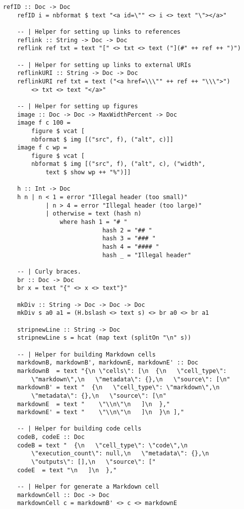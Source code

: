 \begin{lstlisting}[language=haskell1, 
	basicstyle=\linespread{1.1}\small\ttfamily]
	refID :: Doc -> Doc 
	refID i = nbformat $ text "<a id=\"" <> i <> text "\"></a>"
	
	-- | Helper for setting up links to references
	reflink :: String -> Doc -> Doc
	reflink ref txt = text "[" <> txt <> text ("](#" ++ ref ++ ")")
	
	-- | Helper for setting up links to external URIs
	reflinkURI :: String -> Doc -> Doc
	reflinkURI ref txt = text ("<a href=\\\"" ++ ref ++ "\\\">") 
		<> txt <> text "</a>"
	
	-- | Helper for setting up figures
	image :: Doc -> Doc -> MaxWidthPercent -> Doc
	image f c 100 = 
		figure $ vcat [
		nbformat $ img [("src", f), ("alt", c)]]
	image f c wp =
		figure $ vcat [
		nbformat $ img [("src", f), ("alt", c), ("width", 
			text $ show wp ++ "%")]]
	
	h :: Int -> Doc
	h n | n < 1 = error "Illegal header (too small)"
			| n > 4 = error "Illegal header (too large)"          
			| otherwise = text (hash n)
				where hash 1 = "# "
							hash 2 = "## "
							hash 3 = "### "
							hash 4 = "#### "
							hash _ = "Illegal header"
	
	-- | Curly braces.
	br :: Doc -> Doc
	br x = text "{" <> x <> text"}"
	
	mkDiv :: String -> Doc -> Doc -> Doc
	mkDiv s a0 a1 = (H.bslash <> text s) <> br a0 <> br a1
	
	stripnewLine :: String -> Doc
	stripnewLine s = hcat (map text (splitOn "\n" s))
	
	-- | Helper for building Markdown cells
	markdownB, markdownB', markdownE, markdownE' :: Doc
	markdownB  = text "{\n \"cells\": [\n  {\n   \"cell_type\": 
		\"markdown\",\n   \"metadata\": {},\n   \"source\": [\n" 
	markdownB' = text "  {\n   \"cell_type\": \"markdown\",\n   
		\"metadata\": {},\n   \"source\": [\n" 
	markdownE  = text "    \"\\n\"\n   ]\n  },"
	markdownE' = text "    \"\\n\"\n   ]\n  }\n ],"
		
	-- | Helper for building code cells
	codeB, codeE :: Doc
	codeB = text "  {\n   \"cell_type\": \"code\",\n   
		\"execution_count\": null,\n   \"metadata\": {},\n   
		\"outputs\": [],\n   \"source\": [" 
	codeE  = text "\n   ]\n  },"
		
	-- | Helper for generate a Markdown cell
	markdownCell :: Doc -> Doc
	markdownCell c = markdownB' <> c <> markdownE
		

\end{lstlisting}
